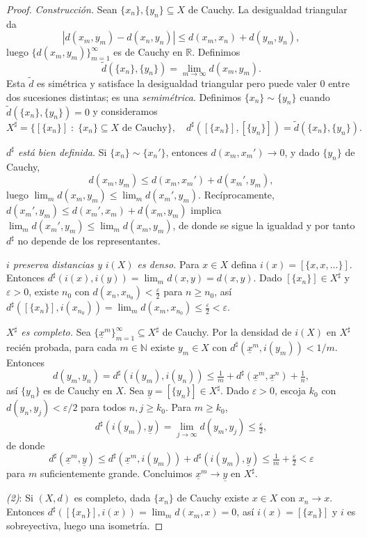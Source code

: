 \documentclass[11pt,twoside]{article}
\newcommand{\R}{\mathbb{R}}
\newcommand{\N}{\mathbb{N}}
\begin{document}
\begin{proof}
\emph{Construcción.} Sean $\{x_{n}\}, \{y_{n}\} \subseteq X$ de Cauchy. La desigualdad triangular da
\[
|d(x_{m}, y_{m}) - d(x_{n}, y_{n})| \leq d(x_{m}, x_{n}) + d(y_{m}, y_{n}),
\]
luego $\{d(x_{m}, y_{m})\}_{m=1}^{\infty}$ es de Cauchy en $\R$. Definimos
\[
\tilde{d}(\{x_{n}\}, \{y_{n}\}) = \lim_{m \to \infty} d(x_{m}, y_{m}).
\]
Esta $\tilde{d}$ es simétrica y satisface la desigualdad triangular pero puede valer $0$ entre dos sucesiones distintas; es una \emph{semimétrica}. Definimos $\{x_{n}\} \sim \{y_{n}\}$ cuando $\tilde{d}(\{x_{n}\}, \{y_{n}\}) = 0$ y consideramos
\[
X^{\sharp} = \big\{[\{x_{n}\}] \;:\; \{x_{n}\} \subseteq X \text{ de Cauchy}\big\}, \quad d^{\sharp}([\{x_{n}\}], [\{y_{n}\}]) = \tilde{d}(\{x_{n}\}, \{y_{n}\}).
\]

\emph{$d^{\sharp}$ está bien definida.} Si $\{x_{n}\} \sim \{x_{n}'\}$, entonces $d(x_{m}, x_{m}') \to 0$, y dado $\{y_{n}\}$ de Cauchy,
\[
d(x_{m}, y_{m}) \leq d(x_{m}, x_{m}') + d(x_{m}', y_{m}),
\]
luego $\lim_{m} d(x_{m}, y_{m}) \leq \lim_{m} d(x_{m}', y_{m})$. Recíprocamente, $d(x_{m}', y_{m}) \leq d(x_{m}', x_{m}) + d(x_{m}, y_{m})$ implica $\lim_{m} d(x_{m}', y_{m}) \leq \lim_{m} d(x_{m}, y_{m})$, de donde se sigue la igualdad y por tanto $d^{\sharp}$ no depende de los representantes.

\emph{$i$ preserva distancias y $i(X)$ es denso.} Para $x \in X$ defina $i(x) = [\{x, x, \dots\}]$. Entonces $d^{\sharp}(i(x), i(y)) = \lim_{m} d(x, y) = d(x, y)$. Dado $[\{x_{n}\}] \in X^{\sharp}$ y $\varepsilon > 0$, existe $n_{0}$ con $d(x_{n}, x_{n_{0}}) < \frac{\varepsilon}{2}$ para $n \geq n_{0}$, así $d^{\sharp}([\{x_{n}\}], i(x_{n_{0}})) = \lim_{m} d(x_{m}, x_{n_{0}}) \leq \frac{\varepsilon}{2} < \varepsilon$.

\emph{$X^{\sharp}$ es completo.} Sea $\{\underline{x}^{m}\}_{m=1}^{\infty} \subseteq X^{\sharp}$ de Cauchy. Por la densidad de $i(X)$ en $X^{\sharp}$ recién probada, para cada $m \in \N$ existe $y_{m} \in X$ con $d^{\sharp}(\underline{x}^{m}, i(y_{m})) < 1/m$. Entonces
\[
d(y_{m}, y_{n}) = d^{\sharp}(i(y_{m}), i(y_{n})) \leq \tfrac{1}{m} + d^{\sharp}(\underline{x}^{m}, \underline{x}^{n}) + \tfrac{1}{n},
\]
así $\{y_{n}\}$ es de Cauchy en $X$. Sea $\underline{y} = [\{y_{n}\}] \in X^{\sharp}$. Dado $\varepsilon > 0$, escoja $k_{0}$ con $d(y_{n}, y_{j}) < \varepsilon/2$ para todos $n, j \geq k_{0}$. Para $m \geq k_{0}$,
\[
d^{\sharp}(i(y_{m}), \underline{y}) = \lim_{j \to \infty} d(y_{m}, y_{j}) \leq \tfrac{\varepsilon}{2},
\]
de donde
\[
d^{\sharp}(\underline{x}^{m}, \underline{y}) \leq d^{\sharp}(\underline{x}^{m}, i(y_{m})) + d^{\sharp}(i(y_{m}), \underline{y}) \leq \tfrac{1}{m} + \tfrac{\varepsilon}{2} < \varepsilon
\]
para $m$ suficientemente grande. Concluimos $\underline{x}^{m} \to \underline{y}$ en $X^{\sharp}$.

\emph{(2)}: Si $(X, d)$ es completo, dada $\{x_{n}\}$ de Cauchy existe $x \in X$ con $x_{n} \to x$. Entonces $d^{\sharp}([\{x_{n}\}], i(x)) = \lim_{m} d(x_{m}, x) = 0$, así $i(x) = [\{x_{n}\}]$ y $i$ es sobreyectiva, luego una isometría.
\end{proof}
\end{document}

